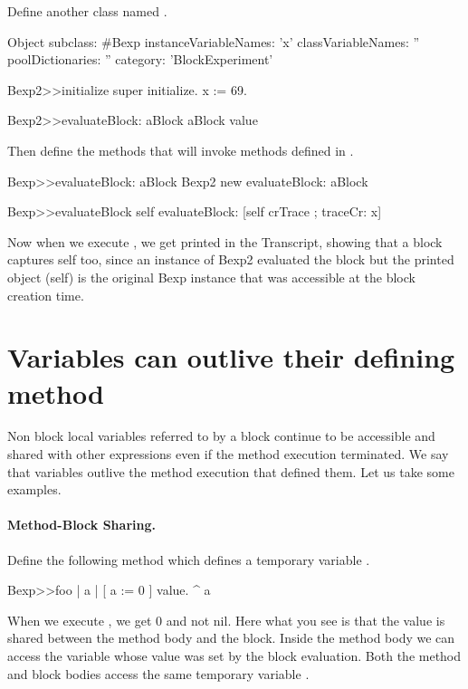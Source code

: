 \documentclass[a4paper,10pt,twoside]{book}
\begin{document}
Define another class named .

\begin{code}{}
Object subclass: #Bexp
	instanceVariableNames: 'x'
	classVariableNames: ''
	poolDictionaries: ''
	category: 'BlockExperiment'

Bexp2>>initialize
	super initialize.
	x := 69.

Bexp2>>evaluateBlock: aBlock
	aBlock value
\end{code}

Then define the methods that will invoke  methods defined in .
\begin{code}{}
Bexp>>evaluateBlock: aBlock
	Bexp2 new evaluateBlock: aBlock

Bexp>>evaluateBlock
	self evaluateBlock: [self crTrace ; traceCr: x]
\end{code}

Now when we execute , we get  printed in the Transcript, showing that a block captures self too, since an instance of Bexp2 evaluated the block but the printed object (self) is the original Bexp instance that was accessible at the block creation time.


\section{Variables can outlive their defining method}

Non block local variables referred to by a block continue to be accessible and shared with other expressions even if the method execution terminated. We say that variables outlive the method execution that defined them.
Let us take some examples.

\paragraph{Method-Block Sharing.} Define the following method  which defines a temporary variable .

\begin{code}{}
Bexp>>foo
	| a |
	[ a := 0 ] value.
	^ a
\end{code}

When we execute , we get 0 and not nil.
Here what you see is that the value is shared between the method body and the block. Inside the method body we can access the variable whose value was set by the block evaluation.
Both the method  and block bodies access the same temporary variable .
\end{document}
